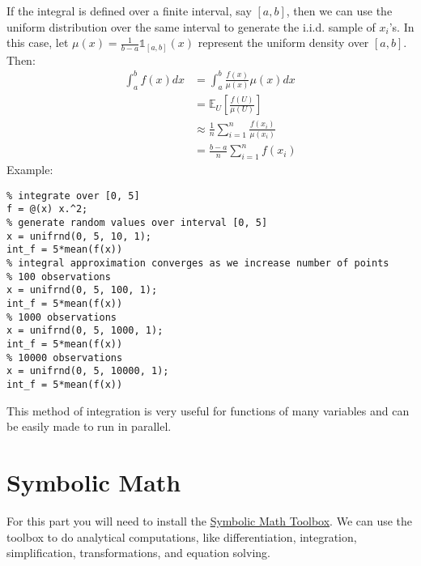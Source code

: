 \documentclass[12pt, a4paper]{article}
\begin{document}
If the integral is defined over a finite interval, say \([a, b]\), then we can use the uniform distribution over the same interval to generate the i.i.d. sample of \(x_i\)'s.
In this case, let \(\mu(x)=\frac{1}{b-a}\mathds{1}_{[a, b]}(x)\) represent the uniform density over \([a, b]\).
Then:
\begin{align*}
\int_{a}^{b}f(x)dx&=\int_{a}^{b}\frac{f(x)}{\mu(x)}\mu(x)dx\\
&=\mathbb{E}_{U}\left[\frac{f(U)}{\mu(U)}\right]\\
&\approx\frac{1}{n}\sum_{i=1}^n\frac{f(x_i)}{\mu(x_i)}\\
&=\frac{b-a}{n}\sum_{i=1}^nf(x_i)
\end{align*}
Example:
\lstset{language=matlab,label= ,caption= ,captionpos=b,firstnumber=1,numbers=left,style=Matlab-editor}
\begin{lstlisting}
% integrate over [0, 5]
f = @(x) x.^2;
% generate random values over interval [0, 5]
x = unifrnd(0, 5, 10, 1);
int_f = 5*mean(f(x))
% integral approximation converges as we increase number of points
% 100 observations
x = unifrnd(0, 5, 100, 1);
int_f = 5*mean(f(x))
% 1000 observations
x = unifrnd(0, 5, 1000, 1);
int_f = 5*mean(f(x))
% 10000 observations
x = unifrnd(0, 5, 10000, 1);
int_f = 5*mean(f(x))
\end{lstlisting}

This method of integration is very useful for functions of many variables and can be easily made to run in parallel.
\section{Symbolic Math}
\label{sec:org2d1d100}
For this part you will need to install the \href{https://www.mathworks.com/help/symbolic/index.html?s\_tid=CRUX\_lftnav}{Symbolic Math Toolbox}.
We can use the toolbox to do analytical computations, like differentiation, integration, simplification, transformations, and equation solving.
\end{document}
